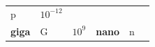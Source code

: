 {{\begin{center}
\begin{tabular}[t]{|l|l|l|l|l|l|}
    
        p &
    
    
        
                \begin{math}{10}^{-12}\end{math}
     \tabularnewline\cline{1-1}\cline{2-2}\cline{3-3}\cline{4-4}\cline{5-5}\cline{6-6}
    
    
        
                \textbf{giga}
               &
    
    
        G &
    
    
        
                \begin{math}{10}^{9}\end{math}
               &
    
    
        
                \textbf{nano}
               &
    
    
        n &
    

\end{tabular}
\end{center}}}
